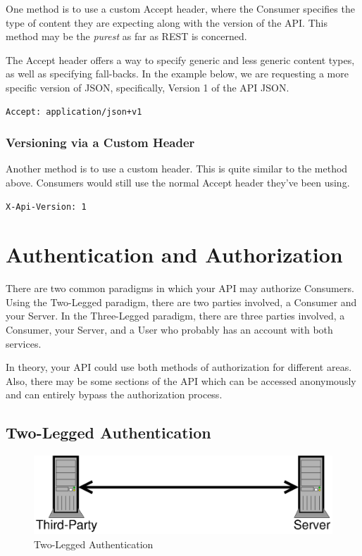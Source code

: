 \documentclass{book}
\begin{document}
One method is to use a custom Accept header, where the Consumer specifies the type of content they are expecting along with the version of the API. This method may be the \emph{purest} as far as REST is concerned.

The Accept header offers a way to specify generic and less generic content types, as well as specifying fall-backs. In the example below, we are requesting a more specific version of JSON, specifically, Version 1 of the API JSON.

\begin{verbatim}
Accept: application/json+v1
\end{verbatim}

\subsubsection{Versioning via a Custom Header}

Another method is to use a custom header. This is quite similar to the method above. Consumers would still use the normal Accept header they've been using.

\begin{verbatim}
X-Api-Version: 1
\end{verbatim}

\section{Authentication and Authorization}

There are two common paradigms in which your API may authorize Consumers. Using the Two-Legged paradigm, there are two parties involved, a Consumer and your Server. In the Three-Legged paradigm, there are three parties involved, a Consumer, your Server, and a User who probably has an account with both services.

In theory, your API could use both methods of authorization for different areas. Also, there may be some sections of the API which can be accessed anonymously and can entirely bypass the authorization process.

\subsection{Two-Legged Authentication}

\begin{figure}[!htb]
\centering
\includegraphics[scale=.6]{images/two-legged.eps}
\caption{Two-Legged Authentication}
\label{fig:twolegged}
\end{figure}
\end{document}
